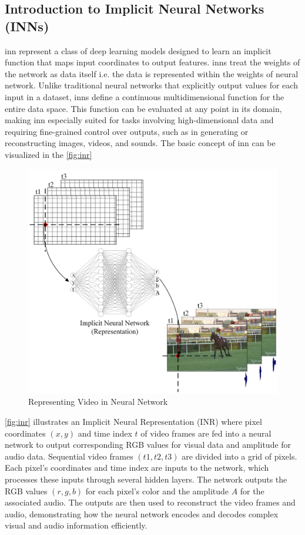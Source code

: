 \documentclass{ioereport}
\begin{document}
    \subsection{Introduction to Implicit Neural Networks (INNs)}
    \gls{inn} represent a class of deep learning models designed to learn an implicit function that maps input coordinates to output features. \gls{inn}s treat the weights of the network as data itself i.e. the data is represented within the weights of neural network. Unlike traditional neural networks that explicitly output values for each input in a dataset, \gls{inn}s define a continuous multidimensional function for the entire data space. This function can be evaluated at any point in its domain, making \gls{inn} especially suited for tasks involving high-dimensional data and requiring fine-grained control over outputs, such as in generating or reconstructing images, videos, and sounds. The basic concept of \gls{inn} can be visualized in the \autoref{fig:inr}
    \begin{figure}[H]
        \centering
        \includegraphics[height=0.45\textheight]{assets/INR.png}
        \caption{Representing Video in Neural Network}
        \label{fig:inr}
    \end{figure}
    \autoref{fig:inr} illustrates an Implicit Neural Representation (INR) where pixel coordinates $(x, y)$ and time index $t$ of video frames are fed into a neural network to output corresponding RGB values for visual data and amplitude for audio data. Sequential video frames $(t1, t2, t3)$ are divided into a grid of pixels. Each pixel's coordinates and time index are inputs to the network, which processes these inputs through several hidden layers. The network outputs the RGB values $(r, g, b)$ for each pixel's color and the amplitude $A$ for the associated audio. The outputs are then used to reconstruct the video frames and audio, demonstrating how the neural network encodes and decodes complex visual and audio information efficiently.
\end{document}
